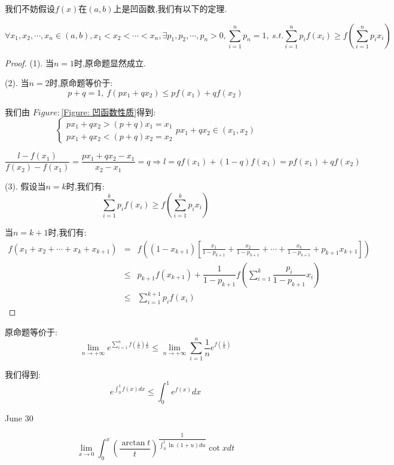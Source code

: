 \begin{solution}
	\begin{anymark}[凹函数性质]
		我们不妨假设$f(x)$在$(a,b)$上是凹函数,我们有以下的定理.
		
		$$\forall x_{1},x_{2},\cdots,x_{n}\in(a,b), x_{1}<x_{2}<\cdots<x_{n}, \exists p_{1},p_{2},\cdots,p_{n}>0,\sum\limits_{i=1}^{n}p_{n}=1,\ s.t. \sum\limits_{i=1}^{n}p_{i}f(x_{i})\geq f(\sum\limits_{i=1}^{n}p_{i}x_{i})$$
		\begin{proof}
			
			(1). 当$n=1$时,原命题显然成立.
			
			(2). 当$n=2$时,原命题等价于: 
			$$p+q=1,\ f(px_{1}+qx_{2})\leq pf(x_{1})+qf(x_{2})$$
			
			我们由 $Figure: $\ref{Figure: 凹函数性质}得到: 
			$$\left\lbrace
			\begin{array}{l}
				px_{1}+qx_{2}>(p+q)x_{1}=x_{1}\\
				px_{1}+qx_{2}<(p+q)x_{2}=x_{2}
			\end{array}
			\right. px_{1}+qx_{2}\in(x_{1},x_{2})$$
			
			$$\dfrac{l-f(x_{1})}{f(x_{2})-f(x_{1})}=\dfrac{px_{1}+qx_{2}-x_{1}}{x_{2}-x_{1}}=q\Rightarrow l=qf(x_{1})+(1-q)f(x_{1})=pf(x_{1})+qf(x_{2})$$
			
			(3). 假设当$n=k$时,我们有: $$\sum\limits_{i=1}^{k}p_{i}f(x_{i})\geq f(\sum\limits_{i=1}^{k}p_{i}x_{i})$$
			
			当$n=k+1$时,我们有: 
			\begin{eqnarray*}
				f(x_{1}+x_{2}+\cdots+x_{k}+x_{k+1})&=&f((1-x_{k+1})[\frac{x_{1}}{1-p_{k+1}}+\frac{x_{2}}{1-p_{k+1}}+\cdots+\frac{x_{k}}{1-p_{k+1}}+p_{k+1}x_{k+1}])\\
				&\leq& p_{k+1}f(x_{k+1})+\dfrac{1}{1-p_{k+1}}f(\sum\limits_{i=1}^{k}\dfrac{p_{i}}{1-p_{k+1}}x_{i})\\
				&\leq & \sum\limits_{i=1}^{k+1}p_{i}f(x_{i})
			\end{eqnarray*}
		\end{proof}
	\end{anymark}
	原命题等价于: 
	$$\lim\limits_{n\to+\infty}e^{\sum\limits_{i=1}^{n}f(\frac{i}{n})\frac{i}{n}}\leq \lim\limits_{n\to+\infty}\sum\limits_{i=1}^{n}\frac{1}{n}e^{f(\frac{i}{n})}$$
	
	我们得到: 
	$$e^{\int_{0}^{1}f(x)dx}\leq \int_{0}^{1}e^{f(x)}dx$$
\end{solution}


\textcolor{purplea}{June 30}

\begin{example}[][Exam: 32.4.17]
	$$\lim\limits_{x\to 0}\int_{0}^{x}(\dfrac{\arctan t}{t})^{\dfrac{1}{\int_{0}^{t}\ln(1+u)du}}\cot xdt$$
\end{example}

